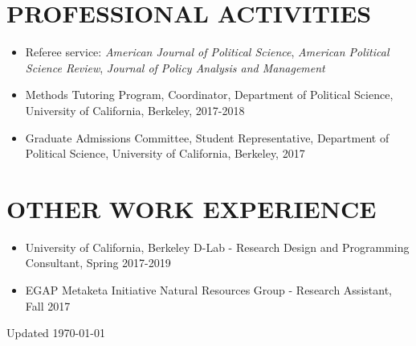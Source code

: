 \documentclass[12pt]{article}
\begin{document}
\vspace{5mm}
\section*{PROFESSIONAL ACTIVITIES}


\begin{itemize}	
\item[]Referee service: \textit{American Journal of Political Science}, \textit{American Political Science Review}, \textit{Journal of Policy Analysis and Management}
\item[]Methods Tutoring Program, Coordinator, Department of Political Science, University of California, Berkeley, 2017-2018
\item[]Graduate Admissions Committee, Student Representative, Department of Political Science, University of California, Berkeley, 2017
\end{itemize}


\vspace{5mm}
\section*{OTHER WORK EXPERIENCE}
	\begin{itemize}
	\item[]University of California, Berkeley D-Lab - Research Design and Programming Consultant, Spring 2017-2019
	\item[]EGAP Metaketa Initiative Natural Resources Group - Research Assistant, Fall 2017
\end{itemize}




\vspace*{\fill}

Updated \today
\end{document}
